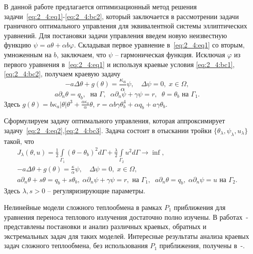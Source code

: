 В данной работе предлагается оптимизационный метод решения задачи~\eqref{eq:2_4:eq1}-\eqref{eq:2_4:bc2},
который заключается в рассмотрении задачи граничного оптимального
управления для эквивалентной системы эллиптических уравнений.
Для постановки задачи управления введем новую неизвестную функцию
$\psi= a\theta + \alpha b \varphi$.
Складывая первое уравнение в~\eqref{eq:2_4:eq1} со вторым, умноженным на $b$,
заключаем, что $\psi$ -- гармоническая функция.
Исключая $\varphi$ из первого уравнения в~\eqref{eq:2_4:eq1} и используя краевые условия
\eqref{eq:2_4:bc1},\eqref{eq:2_4:bc2},
получаем краевую задачу
\begin{equation}
    \label{eq:2_4:eq2}
    - a \Delta \theta + g (\theta) = \frac{\kappa_a}{\alpha}\psi, \quad
    \Delta \psi = 0, \; x \in \Omega,
\end{equation}
\begin{equation}
    \label{eq:2_4:bc3}
    a \partial_n \theta = q_b, \; \text{ на }\Gamma, \;\;
    \alpha \partial_n \psi + \gamma \psi  =  r,\;\;
    \theta = \theta_b  \text{ на }\Gamma_1.
\end{equation}
Здесь $g(\theta) = b \kappa_a|\theta|\theta^3 + \frac{a\kappa_a}{\alpha}\theta$, $r=\alpha b \gamma \theta_b^4+ \alpha q_b + a \gamma \theta_b$.

Сформулируем задачу оптимального управления, которая аппроксимирует
задачу~\eqref{eq:2_4:eq2},\eqref{eq:2_4:bc3}.
Задача состоит в отыскании тройки $\{\theta_\lambda,\psi_\lambda,u_\lambda\}$ такой, что
\begin{equation}
    \label{eq:2_4:cost}
    \begin{split}
        J_\lambda(\theta, u) = \frac{1}{2}\int\limits_{\Gamma_1} (\theta - \theta_b)^2d\Gamma
        + \frac{\lambda}{2}\int\limits_{\Gamma_2} u^2d\Gamma \rightarrow\inf, \\
        - a \Delta \theta + g (\theta) = \frac{\kappa}{\alpha}\psi, \quad
        \Delta \psi = 0, \; x \in \Omega,\\
        a \partial_n \theta + s \theta = q_b + s\theta_b, \; \alpha \partial_n \psi + \gamma \psi = r,
        \text{ на } \Gamma_1,\;\; a \partial_n \theta  = q_b,\;
        \alpha \partial_n \psi = u \text{ на } \Gamma_2.
    \end{split}
\end{equation}
Здесь $\lambda, s > 0$ -- регуляризирующие параметры.


Нелинейные модели сложного теплообмена в рамках $P_1$ приближения для уравнения переноса теплового
излучения достаточно полно изучены.
В работах~\cite{Pinnau2007}-\cite{Mesenev22} представлены постановки и анализ различных краевых,
обратных и экстремальных задач для таких моделей.
Интересные результаты анализа краевых задач сложного теплообмена,
без использования $P_1$ приближения, получены в~\cite{Amosov16}-\cite{Amosov20-1}.

